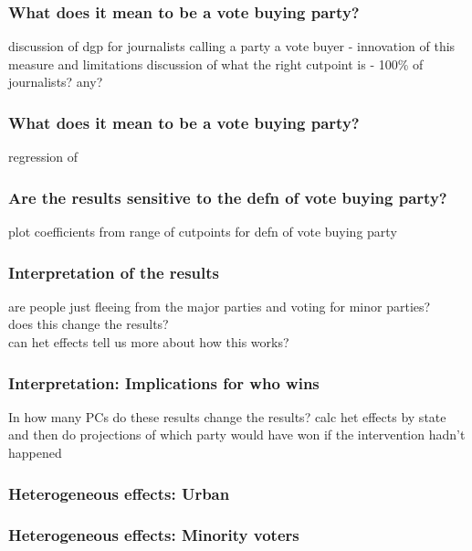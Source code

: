 \documentclass{beamer}
\begin{document}
\begin{frame}
\frametitle{What does it mean to be a vote buying party?}

discussion of dgp for journalists calling a party a vote buyer - innovation of this measure and limitations
discussion of what the right cutpoint is - 100\% of journalists? any?  
 
\end{frame}


\begin{frame}
\frametitle{What does it mean to be a vote buying party?}

regression of 

\end{frame}



\begin{frame}
\frametitle{Are the results sensitive to the defn of vote buying party?}

plot coefficients from range of cutpoints for defn of vote buying party 

\end{frame}


\begin{frame}
\frametitle{Interpretation of the results}

are people just fleeing from the major parties and voting for minor parties?\\
does this change the results? \\
can het effects tell us more about how this works?

\end{frame}


\begin{frame}
\frametitle{Interpretation: Implications for who wins}

In how many PCs do these results change the results?
calc het effects by state and then do projections of which party would have won if the intervention hadn't happened

\end{frame}


\begin{frame}
\frametitle{Heterogeneous effects: Urban}


\end{frame}

\begin{frame}
\frametitle{Heterogeneous effects: Minority voters}


\end{frame}
\end{document}
